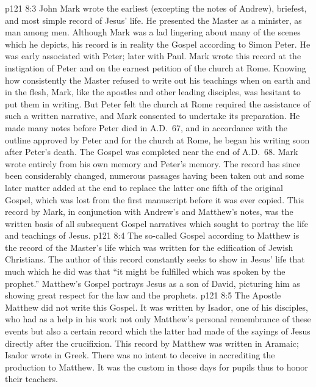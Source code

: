 \pc \vs p121 8:3 \bibnobreakspace {} John Mark wrote the earliest (excepting the notes of Andrew), briefest, and most simple record of Jesus’ life. He presented the Master as a minister, as man among men. Although Mark was a lad lingering about many of the scenes which he depicts, his record is in reality the Gospel according to Simon Peter. He was early associated with Peter; later with Paul. Mark wrote this record at the instigation of Peter and on the earnest petition of the church at Rome. Knowing how consistently the Master refused to write out his teachings when on earth and in the flesh, Mark, like the apostles and other leading disciples, was hesitant to put them in writing. But Peter felt the church at Rome required the assistance of such a written narrative, and Mark consented to undertake its preparation. He made many notes before Peter died in A.D.~67, and in accordance with the outline approved by Peter and for the church at Rome, he began his writing soon after Peter’s death. The Gospel was completed near the end of A.D.~68. Mark wrote entirely from his own memory and Peter’s memory. The record has since been considerably changed, numerous passages having been taken out and some later matter added at the end to replace the latter one fifth of the original Gospel, which was lost from the first manuscript before it was ever copied. This record by Mark, in conjunction with Andrew’s and Matthew’s notes, was the written basis of all subsequent Gospel narratives which sought to portray the life and teachings of Jesus.
\pc \vs p121 8:4 \bibnobreakspace {} The so\hyp{}called Gospel according to Matthew is the record of the Master’s life which was written for the edification of Jewish Christians. The author of this record constantly seeks to show in Jesus’ life that much which he did was that “it might be fulfilled which was spoken by the prophet.” Matthew’s Gospel portrays Jesus as a son of David, picturing him as showing great respect for the law and the prophets.
\vs p121 8:5 The Apostle Matthew did not write this Gospel. It was written by Isador, one of his disciples, who had as a help in his work not only Matthew’s personal remembrance of these events but also a certain record which the latter had made of the sayings of Jesus directly after the crucifixion. This record by Matthew was written in Aramaic; Isador wrote in Greek. There was no intent to deceive in accrediting the production to Matthew. It was the custom in those days for pupils thus to honor their teachers.
